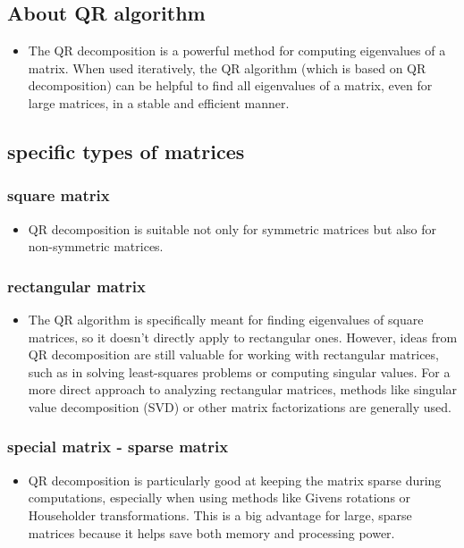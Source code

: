 \documentclass[journal]{IEEEtran}
\begin{document}
\subsection{About QR algorithm}
\begin{itemize}
    \item The QR decomposition is a powerful method for computing eigenvalues of a matrix. When used iteratively, the QR algorithm (which is based on QR decomposition) can be helpful to find all eigenvalues of a matrix, even for large matrices, in a stable and efficient manner.
\end{itemize}
\subsection{specific types of matrices}
\subsubsection{square matrix}
\begin{itemize}
    \item QR decomposition is suitable not only for symmetric matrices but also for non-symmetric matrices.\\
\end{itemize}
\subsubsection{rectangular matrix}
\begin{itemize}
    \item The QR algorithm is specifically meant for finding eigenvalues of square matrices, so it doesn't directly apply to rectangular ones. However, ideas from QR decomposition are still valuable for working with rectangular matrices, such as in solving least-squares problems or computing singular values. For a more direct approach to analyzing rectangular matrices, methods like singular value decomposition (SVD) or other matrix factorizations are generally used.\\
\end{itemize}
\subsubsection{special matrix - sparse matrix}
\begin{itemize}
    \item QR decomposition is particularly good at keeping the matrix sparse during computations, especially when using methods like Givens rotations or Householder transformations. This is a big advantage for large, sparse matrices because it helps save both memory and processing power.
\end{itemize}
\end{document}
